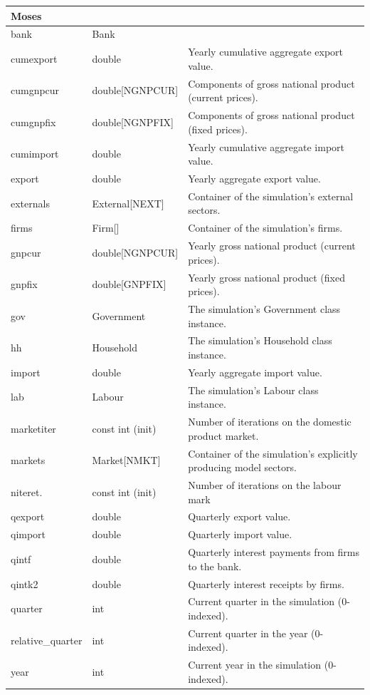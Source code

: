 \documentclass{article}
\begin{document}
\begin{longtable}{p{}p{}p{}}
\multicolumn{3}{l}{\textbf{Moses}} \\
\midrule
bank & Bank &\\
cumexport & double & Yearly cumulative aggregate export value.\\
cumgnpcur & double[NGNPCUR] & Components of gross national product (current prices).\\
cumgnpfix & double[NGNPFIX] & Components of gross national product (fixed prices).\\
cumimport & double & Yearly cumulative aggregate import value.\\
export & double & Yearly aggregate export value.\\
externals & External[NEXT] & Container of the simulation's external sectors.\\
firms & Firm[] & Container of the simulation's firms.\\
gnpcur & double[NGNPCUR] & Yearly gross national product (current prices).\\
gnpfix & double[GNPFIX] & Yearly gross national product (fixed prices).\\
gov & Government & The simulation's Government class instance.\\
hh & Household & The simulation's Household class instance.\\
import & double & Yearly aggregate import value.\\
lab & Labour & The simulation's Labour class instance.\\
marketiter & const int (init) & Number of iterations on the domestic product market.\\
markets & Market[NMKT] & Container of the simulation's explicitly producing model sectors.\\
niteret. & const int (init) & Number of iterations on the labour mark\\
qexport & double & Quarterly export value.\\
qimport & double & Quarterly import value.\\
qintf & double & Quarterly interest payments from firms to the bank.\\
qintk2 & double & Quarterly interest receipts by firms.\\
quarter & int & Current quarter in the simulation (0-indexed).\\
relative\_quarter & int & Current quarter in the year (0-indexed).\\
year & int & Current year in the simulation (0-indexed).\\
\midrule


\end{longtable}
\end{document}
